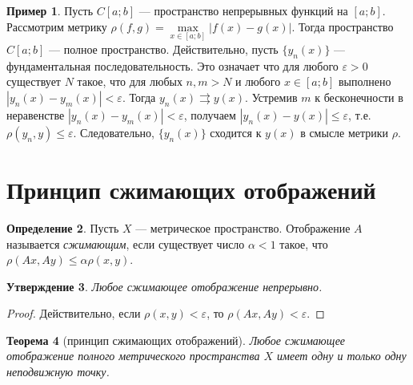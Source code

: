 \documentclass[12pt, titlepage, oneside]{amsbook}
\newtheorem{theorem}{Теорема}[chapter]
\newtheorem{claim}[theorem]{Утверждение}
\theoremstyle{definition}
\newtheorem{example}[theorem]{Пример}
\newtheorem{definition}[theorem]{Определение}
\theoremstyle{remark}
\begin{document}
\begin{example}
Пусть $C[a;b]$ --- пространство непрерывных функций на $[a;b]$. Рассмотрим метрику $\rho(f,g)=\max\limits_{x\in[a;b]}|f(x)-g(x)|$. Тогда пространство $C[a;b]$ --- полное пространство. Действительно, пусть $\{y_n(x)\}$ --- фундаментальная последовательность. Это означает что для любого $\varepsilon>0$ существует $N$ такое, что для любых $n,m>N$ и любого $x\in[a;b]$ выполнено $|y_n(x)-y_m(x)|<\varepsilon$. Тогда $y_n(x)\rightrightarrows y(x)$. Устремив $m$ к бесконечности в неравенстве $|y_n(x)-y_m(x)|<\varepsilon$, получаем $|y_n(x)-y(x)|\leq\varepsilon$, т.е. $\rho(y_n,y)\leq\varepsilon$. Следовательно, $\{y_n(x)\}$ сходится к $y(x)$ в смысле метрики $\rho$.
\end{example}

\section{Принцип сжимающих отображений}

\begin{definition}
Пусть $X$ --- метрическое пространство. Отображение $A$ называется \emph{сжимающим}, если существует число $\alpha<1$ такое, что $\rho(Ax,Ay)\leq\alpha\rho(x,y)$.
\end{definition}

 \begin{claim}
\label{Sj1}
Любое сжимающее отображение непрерывно.
\end{claim}

\begin{proof}
Действительно, если $\rho(x,y)<\varepsilon$, то $\rho(Ax,Ay)<\varepsilon$.
\end{proof}

 \begin{theorem}[принцип сжимающих отображений]
\label{Sj2}
Любое сжимающее отображение полного метрического пространства $X$ имеет одну и только одну неподвижную точку.
\end{theorem}
\end{document}
